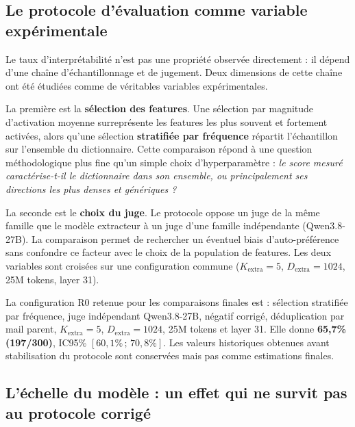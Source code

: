 \documentclass[11pt]{article}
\begin{document}
\subsection{Le protocole d'évaluation comme variable expérimentale}
\label{subsec:correction-methode}

Le taux d'interprétabilité n'est pas une propriété observée directement : il dépend
d'une chaîne d'échantillonnage et de jugement. Deux dimensions de cette chaîne ont
été étudiées comme de véritables variables expérimentales.

La première est la \textbf{sélection des features}. Une sélection par magnitude
d'activation moyenne surreprésente les features les plus souvent et fortement
activées, alors qu'une sélection \textbf{stratifiée par fréquence} répartit
l'échantillon sur l'ensemble du dictionnaire. Cette comparaison répond à une question
méthodologique plus fine qu'un simple choix d'hyperparamètre : \emph{le score mesuré
caractérise-t-il le dictionnaire dans son ensemble, ou principalement ses directions
les plus denses et génériques ?}

La seconde est le \textbf{choix du juge}. Le protocole oppose un juge de la même
famille que le modèle extracteur à un juge d'une famille indépendante (Qwen3.8-27B).
La comparaison permet de rechercher un éventuel biais d'auto-préférence sans confondre
ce facteur avec le choix de la population de features. Les deux variables sont croisées sur une configuration commune
($K_\text{extra}=5$, $D_\text{extra}=1024$, 25M tokens, layer 31).

\begin{resultbox}
La configuration R0 retenue pour les comparaisons finales est : sélection stratifiée
par fréquence, juge indépendant Qwen3.8-27B, négatif corrigé, déduplication par mail
parent, $K_\text{extra}=5$, $D_\text{extra}=1024$, 25M tokens et layer 31. Elle donne
\textbf{65,7\% (197/300)}, IC95\% $[60{,}1\%\,;\,70{,}8\%]$.
Les valeurs historiques obtenues avant stabilisation du protocole sont conservées
mais pas comme estimations finales.
\end{resultbox}

\subsection{L'échelle du modèle : un effet qui ne survit pas au protocole corrigé}
\label{subsec:model-scale}
\end{document}
